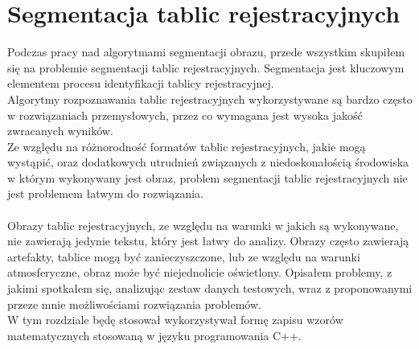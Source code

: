 \section{Segmentacja tablic rejestracyjnych}
Podczas pracy nad algorytmami segmentacji obrazu, przede wszystkim skupiłem się na problemie segmentacji tablic rejestracyjnych. Segmentacja jest kluczowym elementem procesu identyfikacji tablicy rejestracyjnej.\\
Algorytmy rozpoznawania tablic rejestracyjnych wykorzystywane są bardzo często w rozwiązaniach przemysłowych, przez co wymagana jest wysoka jakość zwracanych wyników.\\
Ze względu na różnorodność formatów tablic rejestracyjnych, jakie mogą wystąpić, oraz dodatkowych utrudnień związanych z niedoskonałością środowiska w którym wykonywany jest obraz, problem segmentacji tablic rejestracyjnych nie jest problemem łatwym do rozwiązania.
\paragraph{}
Obrazy tablic rejestracyjnych, ze względu na warunki w jakich są wykonywane, nie zawierają jedynie tekstu, który jest łatwy do analizy. Obrazy często zawierają artefakty, tablice mogą być zanieczyszczone, lub ze względu na warunki atmosferyczne, obraz może być niejednolicie oświetlony. Opisałem problemy, z jakimi spotkałem się, analizując zestaw danych testowych, wraz z proponowanymi przeze mnie możliwościami rozwiązania problemów.\\
W tym rozdziale będę stosował wykorzystywał formę zapisu wzorów matematycznych stosowaną w języku programowania C++.
